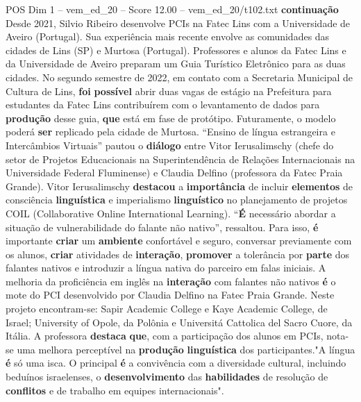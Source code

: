 \begin{textsample}{POS Dim 1 – vem\_ed\_20 – Score 12.00 – vem\_ed\_20/t102.txt}  \label{ex:f1_pos_108}
\textbf{continuação} Desde 2021, Silvio Ribeiro desenvolve PCIs na Fatec Lins com a Universidade de Aveiro (Portugal).
Sua experiência mais recente envolve as comunidades das cidades de Lins (SP) e Murtosa (Portugal).
Professores e alunos da Fatec Lins e da Universidade de Aveiro preparam um Guia Turístico Eletrônico para as duas cidades.
No segundo semestre de 2022, em contato com a Secretaria Municipal de Cultura de Lins, \textbf{foi} \textbf{possível} abrir duas vagas de estágio na Prefeitura para estudantes da Fatec Lins contribuírem com o levantamento de dados para \textbf{produção} desse guia, \textbf{que} está em fase de protótipo.
Futuramente, o modelo poderá \textbf{ser} replicado pela cidade de Murtosa. “Ensino de língua estrangeira e Intercâmbios Virtuais” pautou o \textbf{diálogo} entre Vitor Ierusalimschy (chefe do setor de Projetos Educacionais na Superintendência de Relações Internacionais na Universidade Federal Fluminense) e Claudia Delfino (professora da Fatec Praia Grande).
Vitor Ierusalimschy \textbf{destacou} a \textbf{importância} de incluir \textbf{elementos} de consciência \textbf{linguística} e imperialismo \textbf{linguístico} no planejamento de projetos COIL (Collaborative Online International Learning). “\textbf{É} necessário abordar a situação de vulnerabilidade do falante não nativo”, ressaltou.
Para isso, \textbf{é} importante \textbf{criar} um \textbf{ambiente} confortável e seguro, conversar previamente com os alunos, \textbf{criar} atividades de \textbf{interação}, \textbf{promover} a tolerância por \textbf{parte} dos falantes nativos e introduzir a língua nativa do parceiro em falas iniciais.
A melhoria da proficiência em inglês na \textbf{interação} com falantes não nativos \textbf{é} o mote do PCI desenvolvido por Claudia Delfino na Fatec Praia Grande.
Neste projeto encontram-se: Sapir Academic College e Kaye Academic College, de Israel; University of Opole, da Polônia e Universitá Cattolica del Sacro Cuore, da Itália.
A professora \textbf{destaca} \textbf{que}, com a participação dos alunos em PCIs, nota-se uma melhora perceptível na \textbf{produção} \textbf{linguística} dos participantes."A língua \textbf{é} só uma isca.
O principal \textbf{é} a convivência com a diversidade cultural, incluindo beduínos israelenses, o \textbf{desenvolvimento} das \textbf{habilidades} de resolução de \textbf{conflitos} e de trabalho em equipes internacionais".

\end{textsample}
